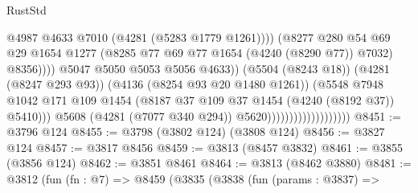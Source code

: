 \begin{lexlean}{RustStd}
\begin{coremodule}
                                                          @4987
                                                          @4633
                                                          @7010
                                                          (@4281 (@5283 @1779 @1261))))
                                                      (@8277
                                                        @280
                                                        @54
                                                        @69
                                                        @29
                                                        @1654
                                                        @1277
                                                        (@8285
                                                          @77
                                                          @69
                                                          @77
                                                          @1654
                                                          (@4240 (@8290 @77))
                                                          @7032)
                                                        @8356))))
                                                @5047
                                                @5050
                                                @5053
                                                @5056
                                                @4633))
                                            (@5504 (@8243 @18))
                                            (@4281 (@8247 @293 @93))
                                            (@4136 (@8254 @93 @20 @1480 @1261))
                                            (@5548
                                              @7948
                                              @1042
                                              @171
                                              @109
                                              @1454
                                              (@8187 @37 @109 @37 @1454 (@4240 (@8192 @37)) @5410)))
                                          @5608
                                          (@4281 (@7077 @340 @294))
                                          @5620)))))))))))))))))))
@8451 := @3796 @124
@8455 := @3798 (@3802 @124) (@3808 @124)
@8456 := @3827 @124
@8457 := @3817 @8456
@8459 := @3813 (@8457 @3832)
@8461 := @3855 (@3856 @124)
@8462 := @3851 @8461
@8464 := @3813 (@8462 @3880)
@8481 := @3812
    (fun (fn : @7) =>
    @8459
      (@3835
        (@3838
          (fun (params : @3837) =>

\end{coremodule}
\end{lexlean}
